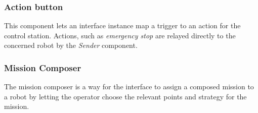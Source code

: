\subsubsection*{Action button}
This component lets an interface instance map a trigger to an action for the control station. Actions, such as \textit{emergency stop} are relayed directly to the concerned robot by the \textit{Sender} component.
\subsubsection*{Mission Composer}
The mission composer is a way for the interface to assign a composed mission to a robot by letting the operator choose the relevant points and strategy for the mission.